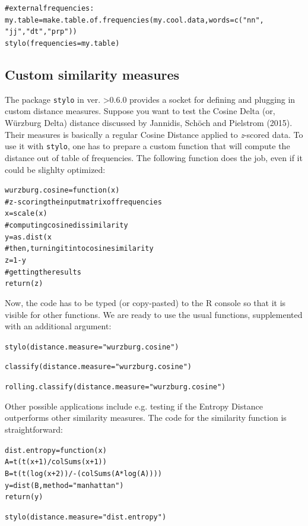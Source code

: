 \documentclass[11pt,a4paper]{article}
\def\code#1{{\tt #1}}
\begin{document}
\begin{alltt}
   # external frequencies:
   my.table = make.table.of.frequencies(my.cool.data, words = c("nn",
         "jj","dt","prp") )
   stylo(frequencies = my.table)
\end{alltt}


\subsection{Custom similarity measures}\label{custom_distances}

The package \code{stylo} in ver. >0.6.0 provides a socket for defining and 
plugging in custom distance measures. Suppose you want to test the 
Cosine Delta (or, W\"urzburg Delta) distance discussed by Jannidis, Sch\"och 
and Pielstrom (2015). Their measures is basically a regular Cosine Distance 
applied to \textit{z}-scored data. To use it with \code{stylo}, one has to
prepare a custom function that will compute the distance out of table
of frequencies. The following function does the job, even if it could be 
slighlty optimized:


\begin{alltt}
    wurzburg.cosine = function(x){
            # z-scoring the input matrix of frequencies
            x = scale(x)
            # computing cosine dissimilarity
            y = as.dist( x %
            # then, turning it into cosine similarity
            z = 1 - y
            # getting the results
            return(z)
    }
\end{alltt}

Now, the code has to be typed (or copy-pasted) to the R console so that it 
is visible for other functions. We are ready to use the usual functions,
supplemented with an additional argument:

\begin{alltt}
stylo(distance.measure = "wurzburg.cosine")

classify(distance.measure = "wurzburg.cosine")

rolling.classify(distance.measure = "wurzburg.cosine")
\end{alltt}

Other possible applications include e.g. testing if the Entropy Distance 
outperforms other similarity measures. The code for the similarity function
is straightforward:

\begin{alltt}
    dist.entropy = function(x) {
            A = t(t(x + 1) / colSums(x + 1))
            B = t(t(log(x + 2)) / -(colSums(A * log(A))))
            y = dist(B, method="manhattan")
            return(y)
    }

stylo(distance.measure = "dist.entropy")
\end{alltt}
\end{document}
